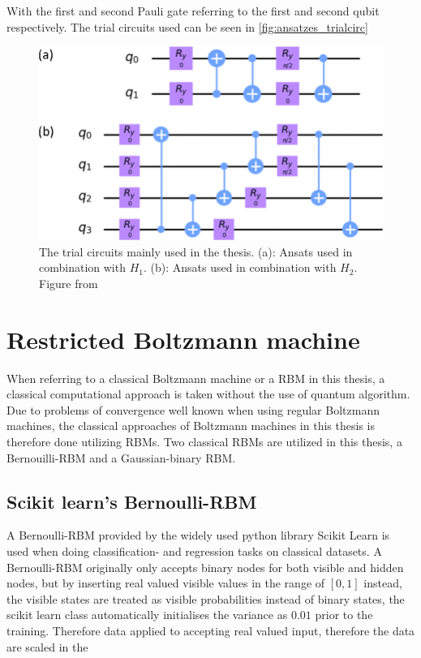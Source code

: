 \documentclass[../main.tex]{subfiles}
\begin{document}
With the first and second Pauli gate referring to the first and second qubit respectively. The trial circuits used can be seen in \autoref{fig:ansatzes_trialcirc}

\begin{figure}[h]
    \begin{center}
        \includegraphics[scale=0.3]{figures/The-depicted-circuits-illustrate-the-initial-trial-state-for-the-Gibbs-state-preparation.png}
        \caption{The trial circuits mainly used in the thesis. (a): Ansats used in combination with $H_1$. (b): Ansats used in combination with $H_2$. Figure from \cite{VQB:litteraturelist}}
        \label{fig:ansatzes_trialcirc}
    \end{center}
\end{figure}


\FloatBarrier
\section{Restricted Boltzmann machine}
When referring to a classical Boltzmann machine or a RBM in this thesis, a classical computational approach is taken without the use of quantum algorithm. Due to problems of convergence well known when using regular Boltzmann machines, the classical approaches of Boltzmann machines in this thesis is therefore done utilizing RBMs. Two classical RBMs are utilized in this thesis, a Bernouilli-RBM and a Gaussian-binary RBM.

\subsection{Scikit learn's Bernoulli-RBM}
A Bernoulli-RBM provided by the widely used python library Scikit Learn\cite{scikitlearn} is used when doing classification- and regression tasks on classical datasets. A Bernoulli-RBM originally only accepts binary nodes for both visible and hidden nodes, but by inserting  real valued visible values in the range of $[0,1]$ instead, the visible states are treated as visible probabilities instead of binary states, the scikit learn class automatically initialises the variance as $0.01$ prior to the training. Therefore data applied to  accepting real valued input, therefore the data are scaled in the 
\end{document}
